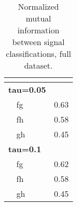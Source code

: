 \begin{table}[!tbp]
\caption{Normalized mutual information between signal classifications, full dataset.\label{NMI}} 
\begin{center}
\begin{tabular}{ll}
\hline\hline
\multicolumn{1}{l}{}&\multicolumn{1}{c}{}\tabularnewline
\hline
{\bfseries tau=0.05}&\tabularnewline
~~fg&0.63\tabularnewline
~~fh&0.58\tabularnewline
~~gh&0.45\tabularnewline
\hline
{\bfseries tau=0.1}&\tabularnewline
~~fg&0.62\tabularnewline
~~fh&0.58\tabularnewline
~~gh&0.45\tabularnewline
\hline
\end{tabular}\end{center}
\end{table}
